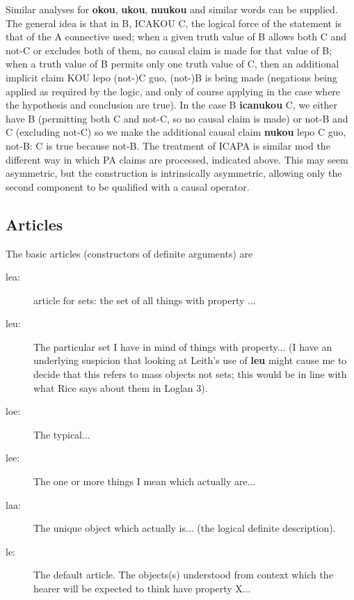 \documentclass[12pt]{book}
\begin{document}
{Similar analyses for {\bf okou}, {\bf ukou}, {\bf nuukou} and similar words can be supplied.  The general idea is that in B, ICAKOU C, the logical force of the statement is that of the A connective used;  when a given truth value of B allows both C and not-C or excludes both of them, no causal claim is made for that value of B;  when a truth value of B permits only one truth value of C, then an additional implicit claim KOU lepo (not-)C guo, (not-)B is being made (negations being applied as required by the logic, and only of course applying in the case where the hypothesis and conclusion are true).  In the case B {\bf icanukou} C, we either have B (permitting both C and not-C, so no causal claim is made) or not-B and C (excluding not-C) so we make the additional causal claim {\bf nukou} lepo C guo, not-B:  C is true because not-B.  The treatment of ICAPA is similar mod the different way in which PA claims are processed, indicated above.
This may seem asymmetric, but the construction is intrinsically asymmetric, allowing only the second component to be qualified with a causal operator.

\subsection{Articles}

The basic articles (constructors of definite arguments) are 

\begin{description}
\item[lea:]  article for sets:  the set of all things with property ...

 \item[leu:]   The particular set I have in mind of things with property... (I have an underlying suspicion that looking at Leith's use of {\bf leu} might cause me to decide that this refers to mass objects not sets;  this would be in line with what Rice says about them in Loglan 3).

 \item[loe:]  The typical...

 \item[lee:]   The one or more things I mean which actually are...

\item[laa:]  The unique object which actually is... (the logical definite description).

 \item[le:]   The default article.  The objects(s) understood from context which the hearer will be expected to think have property X...


\end{description}}
\end{document}
